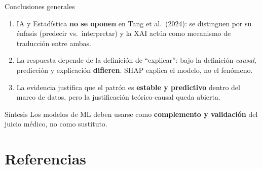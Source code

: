 \documentclass[aspectratio=169,11pt]{beamer}
\begin{document}
\begin{frame}{Conclusiones generales}
  \begin{enumerate}
    \item[\textbf{P1}] IA y Estadística \textbf{no se oponen} en Tang et al.\ (2024):
          se distinguen por su énfasis (predecir vs.\ interpretar) y la XAI actúa como
          mecanismo de traducción entre ambas.
    \vspace{0.4em}
    \item[\textbf{P2}] La respuesta depende de la definición de ``explicar'':
          bajo la definición \textit{causal}, predicción y explicación \textbf{difieren}.
          SHAP explica el modelo, no el fenómeno.
    \vspace{0.4em}
    \item[\textbf{P3}] La evidencia justifica que el patrón es \textbf{estable y predictivo}
          dentro del marco de datos, pero la justificación teórico-causal queda abierta.
  \end{enumerate}
  \vspace{0.5em}
  \begin{block}{Síntesis}
    \centering
    Los modelos de ML deben usarse como \textbf{complemento y validación}
    del juicio médico, no como sustituto.
  \end{block}
\end{frame}

\section*{Referencias}
\end{document}
